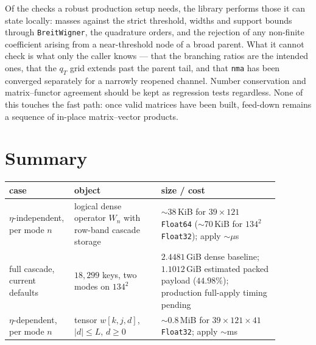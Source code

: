 \documentclass[11pt]{article}
\begin{document}
Of the checks a robust production setup needs, the library performs those
it can state locally: masses against the strict threshold, widths and support
bounds through \texttt{BreitWigner}, the quadrature orders, and the rejection
of any non-finite coefficient arising from a near-threshold node of a broad
parent.  What it cannot check is what only the caller knows --- that the
branching ratios are the intended ones, that the $q_T$ grid extends past the
parent tail, and that \texttt{nma} has been converged separately for a narrowly
reopened channel.  Number conservation and matrix--functor agreement should be
kept as regression tests regardless.  None of this touches the fast path: once
valid matrices have been built, feed-down remains a sequence of in-place
matrix--vector products.

\section{Summary}

\begin{center}
\begin{tabular}{
>{\raggedright\arraybackslash}p{0.21\linewidth}
>{\raggedright\arraybackslash}p{0.29\linewidth}
>{\raggedright\arraybackslash}p{0.38\linewidth}}
\hline
case & object & size / cost \\
\hline
$\eta$-independent, per mode $n$ & logical dense operator $W_n$ with
row-band cascade storage &
$\sim$38\,KiB for $39\times121$ \texttt{Float64}
($\sim$70\,KiB for $134^2$ \texttt{Float32}); apply $\sim\mu$s \\
full cascade, current defaults & $18{,}299$ keys, two modes on $134^2$ &
$2.4481$\,GiB dense baseline; $1.1012$\,GiB estimated packed payload
($44.98\%$); production full-apply timing pending \\
$\eta$-dependent, per mode $n$ & tensor $w[k,j,d]$, $|d|\le L$, $d\ge0$ &
$\sim$0.8\,MiB for $39\times121\times41$ \texttt{Float32}; apply $\sim$ms \\
\hline
\end{tabular}
\end{center}
\end{document}
